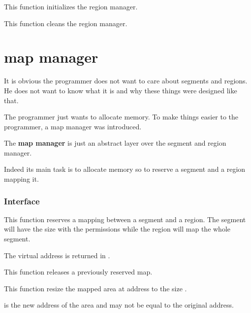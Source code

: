 	 {
	   This function initializes the region manager.
	 }

	 {
	   This function cleans the region manager.
	 }

%
%

\section{map manager}

It is obvious the programmer does not want to care about segments and
regions. He does not want to know what it is and why these things were
designed like that.

The programmer just wants to allocate memory. To make things easier
to the programmer, a map manager was introduced.

The \textbf{map manager} is just an abstract layer over the segment
and region manager.

Indeed its main task is to allocate memory so to reserve a segment
and a region mapping it.

%
%

\subsubsection{Interface}

	 {
	   This function reserves a mapping between a segment and a region.
	   The segment will have the size  with the permissions
	    while the region will map the whole segment.

	   The virtual address is returned in .
	 }

	 {
	   This function releases a previously reserved map.
	 }

	 {
	   This function resize the mapped area at address 
	   to the size .

	    is the new address of the area and may not be
	   equal to the original address.

	 }


